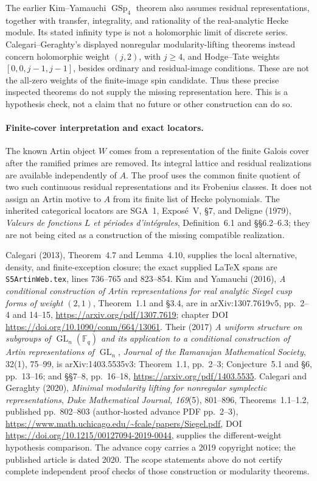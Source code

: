 The earlier Kim--Yamauchi \(\operatorname{GSp}_4\) theorem
also assumes residual representations, together with transfer,
integrality, and rationality of the real-analytic Hecke module.
Its stated infinity type is not a holomorphic limit of
discrete series.  Calegari--Geraghty's displayed nonregular
modularity-lifting theorems instead concern holomorphic
weight \((j,2)\), with \(j\ge4\), and Hodge--Tate weights
\([0,0,j-1,j-1]\), besides ordinary and residual-image
conditions.  These are not the all-zero weights of the
finite-image spin candidate.  Thus these precise inspected
theorems do not supply the missing representation here.
This is a hypothesis check, not a claim that no future or
other construction can do so.

\paragraph{Finite-cover interpretation and exact locators.}
The known Artin object \(W\) comes from a representation
of the finite Galois cover after the ramified primes are
removed.  Its integral lattice and residual realizations
are available independently of \(A\).  The proof uses the
common finite quotient of two such continuous residual
representations and its Frobenius classes.  It does not
assign an Artin motive to \(A\) from its finite list of
Hecke polynomials.  The inherited categorical locators are
SGA~1, Expos\'e~V, \S7, and Deligne (1979),
\emph{Valeurs de fonctions \(L\) et p\'eriodes d'int\'egrales},
Definition~6.1 and \S\S6.2--6.3; they are not being cited
as a construction of the missing compatible realization.

Calegari (2013), Theorem~4.7 and Lemma~4.10, supplies the
local alternative, density, and finite-exception closure;
the exact supplied LaTeX spans are
\texttt{S5ArtinWeb.tex}, lines 736--765 and 823--854.
Kim and Yamauchi (2016),
\emph{A conditional construction of Artin representations
for real analytic Siegel cusp forms of weight \((2,1)\)},
Theorem~1.1 and \S3.4, are in arXiv:1307.7619v5,
pp.~2--4 and 14--15,
\url{https://arxiv.org/pdf/1307.7619}; chapter DOI
\url{https://doi.org/10.1090/conm/664/13061}.
Their (2017) \emph{A uniform structure on subgroups of
\(\operatorname{GL}_n(\mathbb F_q)\) and its application to a
conditional construction of Artin representations of
\(\operatorname{GL}_n\)}, \emph{Journal of the Ramanujan
Mathematical Society}, 32(1), 75--99, is arXiv:1403.5535v3:
Theorem~1.1, pp.~2--3; Conjecture~5.1 and \S6,
pp.~13--16; and \S\S7--8, pp.~16--18,
\url{https://arxiv.org/pdf/1403.5535}.
Calegari and Geraghty (2020), \emph{Minimal modularity
lifting for nonregular symplectic representations},
\emph{Duke Mathematical Journal, 169}(5), 801--896,
Theorems~1.1--1.2, published pp.~802--803
(author-hosted advance PDF pp.~2--3),
\url{https://www.math.uchicago.edu/~fcale/papers/Siegel.pdf},
DOI \url{https://doi.org/10.1215/00127094-2019-0044},
supplies the different-weight hypothesis comparison.
The advance copy carries a 2019 copyright notice; the
published article is dated 2020.
The scope statements above do not certify complete independent
proof checks of those construction or modularity theorems.
